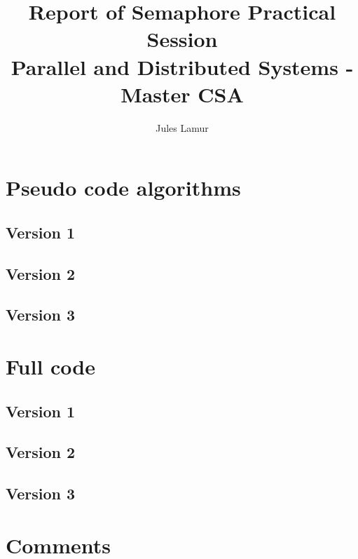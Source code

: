 \documentclass[a4paper, 12pt]{article}
\title{Report of Semaphore Practical Session
    \\ \large Parallel and Distributed Systems - Master CSA}
\author{Jules Lamur}
\begin{document}
\maketitle

\newpage

\section{Pseudo code algorithms}
\subsection{Version 1}
    \begin{multicols}{2}
        
    \end{multicols}
\subsection{Version 2}
    \begin{multicols}{2}
        
    \end{multicols}
\subsection{Version 3}
    \begin{multicols}{2}
        
    \end{multicols}

\newpage

\section{Full code}
\subsection{Version 1}
    
    \newpage
\subsection{Version 2}
    
    \newpage
\subsection{Version 3}
    

\newpage

\section{Comments}
\end{document}
